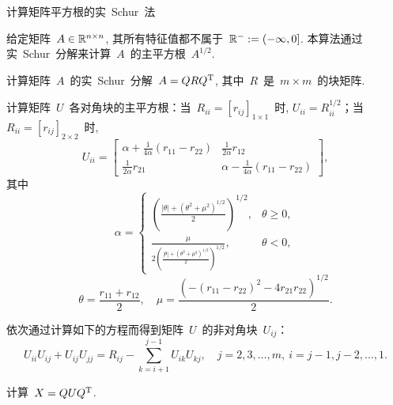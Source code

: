 \begin{algorithm}[h!]
\caption{计算矩阵平方根的实~Schur~法~\cite{Higham1987}}
\label{al:MatSquRoot_RealSchurMethod} 给定矩阵~$A\in\mathbb{R}^{n\times
n}$, 其所有特征值都不属于~$\mathbb{R}^- := (-\infty,0]$.
本算法通过实~Schur~分解来计算~$A$~的主平方根~$A^{1/2}$.
\begin{list}{.}{
\setlength{\rightmargin}{0em}\setlength{\leftmargin}{1.2em}}
\item
计算矩阵~$A$~的实~Schur~分解~$A = QR{Q}^\mathrm{T}$, 其中~$R$~是~$m\times
m$~的块矩阵.
\item
计算矩阵~$U$~各对角块的主平方根：当~$R_{ii}=[r_{ij}]_{1\times1}$~时,
$U_{ii} = R_{ii}^{1/2}$；当~$R_{ii}=[r_{ij}]_{2\times2}$~时,
$$
U_{ii} = \left[\begin{array}{cc} \alpha +
\displaystyle\frac{1}{4\alpha}(r_{11}-r_{22}) &
\displaystyle\frac{1}{2\alpha}r_{12} \\
\displaystyle\frac{1}{2\alpha}r_{21} & \alpha -
\displaystyle\frac{1}{4\alpha}(r_{11}-r_{22})
\end{array}\right],
$$
其中
\begin{equation*}
\alpha = \left\{
\begin{array}{ll}
\displaystyle \left(\frac{|\theta|+(\theta^2 +
\mu^2)^{1/2}}{2}\right)^{1/2}, & \theta \geq 0,\\
\displaystyle
\frac{\mu}{2\left(\displaystyle\frac{|\theta|+(\theta^2 +
\mu^2)^{1/2}}{2}\right)^{1/2}}, & \theta <0,
\end{array}
\right.
\end{equation*}
$$
\theta = \frac{r_{11}+r_{12}}{2},\quad \mu =
\frac{\left(-(r_{11}-r_{22})^2-4r_{21}r_{22}\right)^{1/2}}{2}.
$$
\item
依次通过计算如下的方程而得到矩阵~$U$~的非对角块~$U_{ij}$：
$$
U_{ii}U_{ij} + U_{ij}U_{jj} = R_{ij} - \sum_{k=i+1}^{j-1}
U_{ik}U_{kj}, \quad j = 2,3,\ldots,m,\ i = j-1,j-2,\ldots,1.
$$
\item
计算~$X = QU{Q}^\mathrm{T}$.
\end{list}
\end{algorithm}




